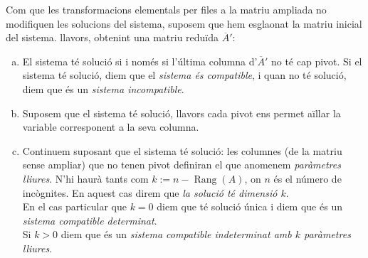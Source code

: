 \documentclass[a4paper,12pt,twoside]{article}
\newcommand{\1}{\mathbf{1}}
\newcommand{\0}{\mathbf{0}}
\DeclareMathOperator{\Rang}{Rang}
\theoremstyle{definition}
\theoremstyle{remark}
\begin{document}
Com que les transformacions elementals per files a la matriu ampliada no modifiquen les solucions del sistema, suposem que hem esglaonat la matriu inicial del sistema. llavors, obtenint una matriu reduïda $\overline{A}'$:
\begin{enumerate}[(a)]
	\item El sistema té solució si i només si l'última columna d'$\overline{A}'$ no té cap pivot. Si el sistema té solució, diem que el \emph{sistema és compatible}, i quan no té solució, diem que és un \emph{sistema incompatible}.
	\item Suposem que el sistema té solució, llavors cada pivot ens permet aïllar la variable corresponent a la seva columna.
	\item Continuem suposant que el sistema té solució: les columnes (de la matriu sense ampliar) que no tenen pivot definiran el que anomenem \emph{paràmetres lliures}. N'hi haurà tants com $k:=n-\Rang(A)$, on $n$ és el número de incògnites. En aquest cas direm que \emph{la solució té dimensió $k$}.\\
	En el cas particular que $k=0$ diem que té solució única i diem que és un \emph{sistema compatible determinat}.\\
	Si $k>0$ diem que és un \emph{sistema compatible indeterminat amb $k$ paràmetres lliures}.
\end{enumerate}
\end{document}
